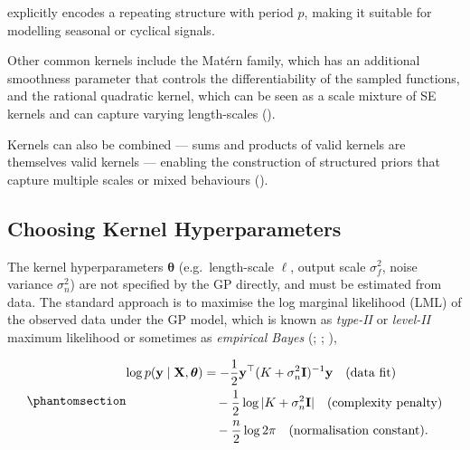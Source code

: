 \documentclass[
  letterpaper,
  DIV=11,
  numbers=noendperiod]{scrartcl}
\begin{document}
explicitly encodes a repeating structure with period \(p\), making it
suitable for modelling seasonal or cyclical signals.

Other common kernels include the Matérn family, which has an additional
smoothness parameter that controls the differentiability of the sampled
functions, and the rational quadratic kernel, which can be seen as a
scale mixture of SE kernels and can capture varying length-scales
().

Kernels can also be combined --- sums and products of valid kernels are
themselves valid kernels --- enabling the construction of structured
priors that capture multiple scales or mixed behaviours
().

\subsection{Choosing Kernel
Hyperparameters}\label{sec-kernel-hyperparams}

The kernel hyperparameters \(\boldsymbol{\theta}\) (e.g.~length-scale
\(\ell\), output scale \(\sigma_f^2\), noise variance \(\sigma_n^2\))
are not specified by the GP directly, and must be estimated from data.
The standard approach is to maximise the log marginal likelihood (LML)
of the observed data under the GP model, which is known as
\emph{type-II} or \emph{level-II} maximum likelihood or sometimes as
\emph{empirical Bayes} (; ; ),

\begin{equation}\phantomsection\label{eq-log-marginal-likelihood}{
\begin{aligned}
\log p(\mathbf{y} \mid \mathbf{X}, \boldsymbol{\theta}) &= -\frac{1}{2}\mathbf{y}^\top(K + \sigma_n^2\mathbf{I})^{-1}\mathbf{y} \quad\text{(data fit)} \\
&\quad - \frac{1}{2}\log |K + \sigma_n^2\mathbf{I}| \quad\text{(complexity penalty)} \\
&\quad - \frac{n}{2}\log 2\pi \quad\text{(normalisation constant)}.
\end{aligned}
}\end{equation}
\end{document}
